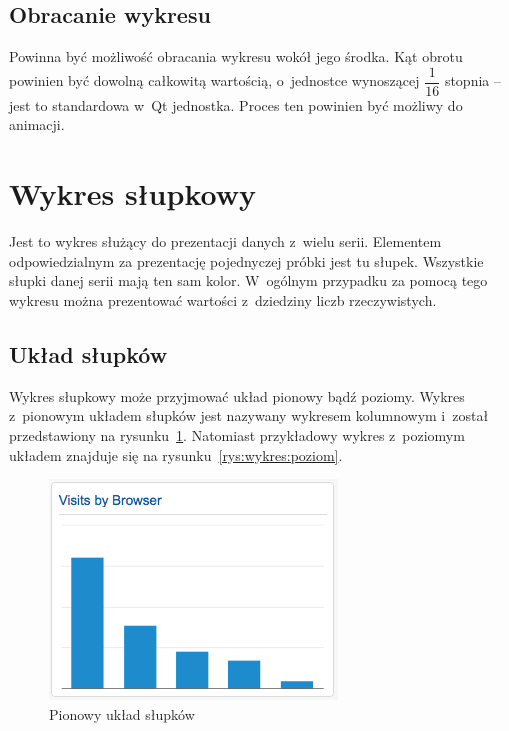 \subsection{Obracanie wykresu}
Powinna być możliwość obracania wykresu wokół jego środka. Kąt obrotu powinien być dowolną całkowitą wartością, o~jednostce wynoszącej $\dfrac{1}{16}$ stopnia -- jest to standardowa w~Qt jednostka. Proces ten powinien być możliwy do animacji.
 

\section{Wykres słupkowy}
Jest to wykres służący do prezentacji danych z~wielu serii. Elementem odpowiedzialnym za prezentację pojednyczej próbki jest tu słupek. Wszystkie słupki danej serii mają ten sam kolor. W~ogólnym przypadku za pomocą tego wykresu można prezentować wartości z~dziedziny liczb rzeczywistych.

\subsection{Układ słupków} 
Wykres słupkowy może przyjmować układ pionowy bądź poziomy. Wykres z~pionowym układem słupków jest  nazywany wykresem kolumnowym i~został przedstawiony na rysunku~\ref{rys:wykres:pion}. Natomiast przykładowy wykres z~poziomym układem znajduje się na rysunku~\ref{rys:wykres:poziom}.

\begin{figure}[H]
\centering
\includegraphics[scale=0.8]{img/bar-ver.png}
\caption{Pionowy układ słupków}\label{rys:wykres:pion}
\end{figure}

